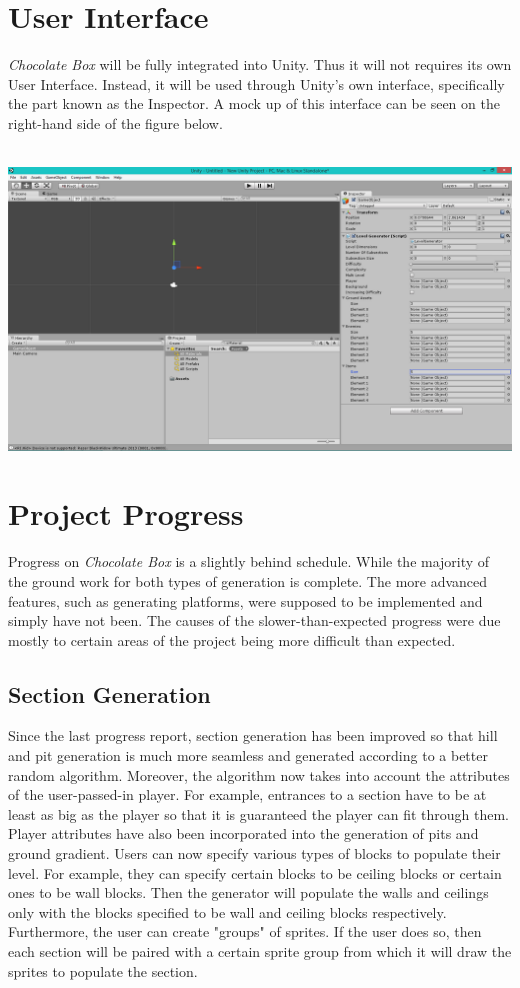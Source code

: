 \documentclass[pdftex,12pt,letter]{article}
\begin{document}
\begin{itemize}
\begin{itemize}
\begin{itemize}
\begin{itemize}
\section{User Interface}
\textit{Chocolate Box} will be fully integrated into Unity. Thus it will not requires its own User Interface. Instead, it will be used through Unity's own interface, specifically the part known as the Inspector. A mock up of this interface can be seen on the right-hand side of the figure below.\\\\
\centerline{\includegraphics[width=7in]{UnitySS.png}}
\FloatBarrier
\section{Project Progress}
Progress on \textit{Chocolate Box} is a slightly behind schedule. While the majority of the ground work for both types of generation is complete. The more advanced features, such as generating platforms, were supposed to be implemented and simply have not been. The causes of the slower-than-expected progress were due mostly to certain areas of the project being more difficult than expected.
\subsection{Section Generation}
Since the last progress report, section generation has been improved so that hill and pit generation is much more seamless and generated according to a better random algorithm. Moreover, the algorithm now takes into account the attributes of the user-passed-in player. For example, entrances to a section have to be at least as big as the player so that it is guaranteed the player can fit through them. Player attributes have also been incorporated into the generation of pits and ground gradient. Users can now specify various types of blocks to populate their level. For example, they can specify certain blocks to be ceiling blocks or certain ones to be wall blocks. Then the generator will populate the walls and ceilings only with the blocks specified to be wall and ceiling blocks respectively. Furthermore, the user can create "groups" of sprites. If the user does so, then each section will be paired with a certain sprite group from which it will draw the sprites to populate the section. 

\end{itemize}
\end{itemize}
\end{itemize}
\end{itemize}
\end{document}
